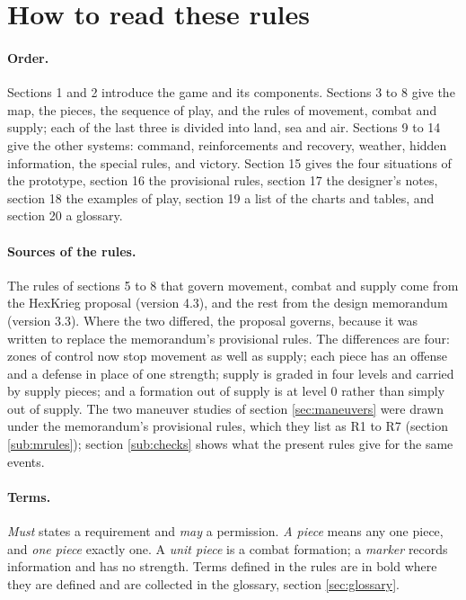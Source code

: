 \documentclass[11pt]{article}
\begin{document}
\section*{How to read these rules}
\label{sec:howto}
\paragraph{Order.} Sections 1 and 2 introduce the game and its components. Sections 3 to 8 give the map, the pieces, the sequence of play, and the rules of movement, combat and supply; each of the last three is divided into land, sea and air. Sections 9 to 14 give the other systems: command, reinforcements and recovery, weather, hidden information, the special rules, and victory. Section 15 gives the four situations of the prototype, section 16 the provisional rules, section 17 the designer's notes, section 18 the examples of play, section 19 a list of the charts and tables, and section 20 a glossary.

\paragraph{Sources of the rules.} The rules of sections 5 to 8 that govern movement, combat and supply come from the HexKrieg proposal (version 4.3), and the rest from the design memorandum (version 3.3). Where the two differed, the proposal governs, because it was written to replace the memorandum's provisional rules. The differences are four: zones of control now stop movement as well as supply; each piece has an offense and a defense in place of one strength; supply is graded in four levels and carried by supply pieces; and a formation out of supply is at level 0 rather than simply out of supply. The two maneuver studies of section \ref{sec:maneuvers} were drawn under the memorandum's provisional rules, which they list as R1 to R7 (section \ref{sub:mrules}); section \ref{sub:checks} shows what the present rules give for the same events.

\paragraph{Terms.} \emph{Must} states a requirement and \emph{may} a permission. \emph{A piece} means any one piece, and \emph{one piece} exactly one. A \emph{unit piece} is a combat formation; a \emph{marker} records information and has no strength. Terms defined in the rules are in bold where they are defined and are collected in the glossary, section \ref{sec:glossary}.
\end{document}
